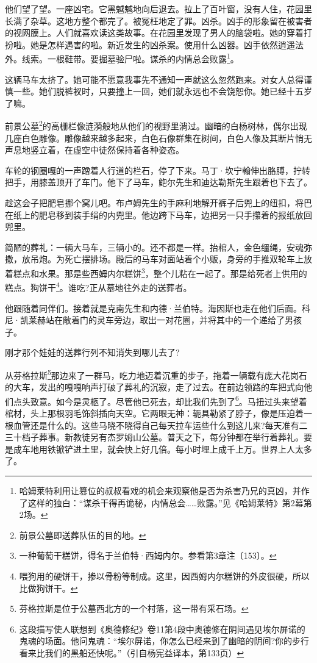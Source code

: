 \par 他们望了望。一座凶宅。它黑魆魆地向后退去。拉上了百叶窗，没有人住，花园里长满了杂草。这地方整个都完了。被冤枉地定了罪。凶杀。凶手的形象留在被害者的视网膜上。人们就喜欢读这类故事。在花园里发现了男人的脑袋啦。她的穿着打扮啦。她是怎样遇害的啦。新近发生的凶杀案。使用什么凶器。凶手依然逍遥法外。线索。一根鞋带。要掘墓验尸啦。谋杀的内情总会败露\footnote{哈姆莱特利用让篡位的叔叔看戏的机会来观察他是否为杀害乃兄的真凶，并作了这样的独白：“谋杀干得再诡秘，内情总会……败露。”见《哈姆莱特》第2幕第2场。}。
\par 这辆马车太挤了。她可能不愿意我事先不通知一声就这么忽然跑来。对女人总得谨慎一些。她们脱裤衩时，只要撞上一回，她们就永远也不会饶恕你。她已经十五岁了嘛。
\par 前景公墓\footnote{前景公墓即送葬队伍的目的地。}的高栅栏像涟漪般地从他们的视野里淌过。幽暗的白杨树林，偶尔出现几座白色雕像。雕像越来越多起来，白色石像群集在树间，白色人像及其断片悄无声息地竖立着，在虚空中徒然保持着各种姿态。
\par 车轮的钢圈嘎的一声蹭着人行道的栏石，停了下来。马丁·坎宁翰伸出胳膊，拧转把手，用膝盖顶开了车门。他下了马车，鲍尔先生和迪达勒斯先生跟着也下去了。
\par 趁这会子把肥皂挪个窝儿吧。布卢姆先生的手麻利地解开裤子后兜上的纽扣，将巴在纸上的肥皂移到装手绢的内兜里。他边跨下马车，边把另一只手攥着的报纸放回兜里。
\par 简陋的葬礼：一辆大马车，三辆小的。还不都是一样。抬棺人，金色缰绳，安魂弥撒，放吊炮。为死亡摆排场。殿后的马车对面站着个小贩，身旁的手推双轮车上放着糕点和水果。那是些西姆内尔糕饼\footnote{一种葡萄干糕饼，得名于兰伯特·西姆内尔。参看第3章注〔153〕。}，整个儿粘在一起了。那是给死者上供用的糕点。狗饼干\footnote{喂狗用的硬饼干，掺以骨粉等制成。这里，因西姆内尔糕饼的外皮很硬，所以比做狗饼干。}。谁吃?正从墓地往外走的送葬者。
\par 他跟随着同伴们。接着就是克南先生和内德·兰伯特。海因斯也走在他们后面。科尼·凯莱赫站在敞着门的灵车旁边，取出一对花圈，并将其中的一个递给了男孩子。
\par 刚才那个娃娃的送葬行列不知消失到哪儿去了?
\par 从芬格拉斯\footnote{芬格拉斯是位于公墓西北方的一个村落，这一带有采石场。}那边来了一群马，吃力地迈着沉重的步子，拖着一辆载有庞大花岗石的大车，发出的嘎嘎响声打破了葬礼的沉寂，走了过去。在前边领路的车把式向他们点头致意。如今是灵柩了。尽管他已死去，却比我们先到了\footnote{这段描写使人联想到《奥德修纪》卷11第4段中奥德修在阴间遇见埃尔屏诺的鬼魂的场面。他问鬼魂：“埃尔屏诺，你怎么已经来到了幽暗的阴间?你的步行看来比我们的黑船还快呢。”（引自杨宪益译本，第133页）}。马扭过头来望着棺材，头上那根羽毛饰斜插向天空。它两眼无神：轭具勒紧了脖子，像是压迫着一根血管还是什么的。这些马晓不晓得自己每天拉车运些什么到这儿来?每天准有二三十档子葬事。新教徒另有杰罗姆山公墓。普天之下，每分钟都在举行着葬礼。要是成车地用铁锨铲进土里，就会快上好几倍。每小时埋上成千上万。世界上人太多了。
